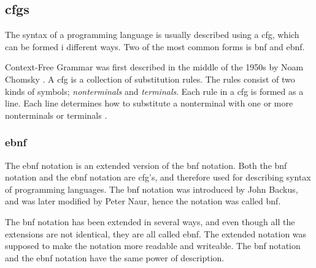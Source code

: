 \subsection{\ac{cfgs}}
\label{sec:cfg}
The syntax of a programming language is usually described using a \ac{cfg}, which can be formed i different ways. Two of the most common forms is \ac{bnf} and \ac{ebnf}.

Context-Free Grammar was first described in the middle of the 1950s by Noam Chomsky \cite{concepts_prog_lang}. A \ac{cfg} is a collection of substitution rules. The rules consist of two kinds of symbols; \textit{nonterminals} and \textit{terminals}. Each rule in a \ac{cfg} is formed as a line. Each line determines how to substitute a nonterminal with one or more nonterminals or terminals \cite{syntax_book}.

\subsubsection*{\ac{ebnf}}
\label{sec:ebnf}
The \ac{ebnf} notation is an extended version of the \ac{bnf} notation. Both the \ac{bnf} notation and the \ac{ebnf} notation are \ac{cfg}'s, and therefore used for describing syntax of programming languages. The \ac{bnf} notation was introduced by John Backus, and was later modified by Peter Naur, hence the notation was called \ac{bnf}.

The \ac{bnf} notation has been extended in several ways, and even though all the extensions are not identical, they are all called \ac{ebnf}. The extended notation was supposed to make the notation more readable and writeable. The \ac{bnf} notation and the \ac{ebnf} notation have the same power of description. \cite{concepts_prog_lang}

